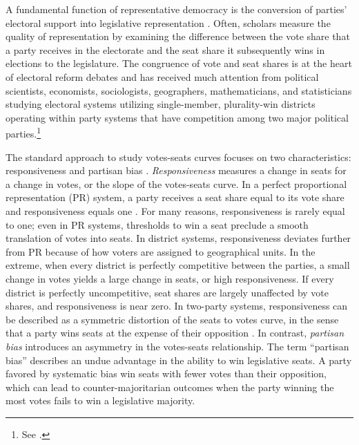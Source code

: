 \documentclass[letter,12pt]{article}
\begin{document}





\noindent A fundamental function of representative democracy is the conversion of parties' electoral support into legislative representation \citep{lijphartElSysPtySys.1994}. Often, scholars measure the quality of representation by examining the difference between the vote share that a party receives in the electorate and the seat share it subsequently wins in elections to the legislature. The congruence of vote and seat shares is at the heart of electoral reform debates and has received much attention from political scientists, economists, sociologists, geographers, mathematicians, and statisticians studying electoral systems utilizing single-member, plurality-win districts operating within party systems that have competition among two major political parties.\footnote{See \citet{altman.mcdonald2011bard,balinskiYoung2001FairRep,brady.grofmanBiasResponsiveness1991,cain.partisanRedistricting.1985,cox.katz.2002,engstrom2006redisttrictApsr,erikson1972malapportionment,gelman.king.1994EvalElSysRedis,grofmanBiasProportionality.1983,grofman.etalBiasMalapp.1997,gudgin.taylor.1980decomposeBias,JohnstonCreepingMal,kendall.stuartCubeLaw1950,king.browning1987biasRespUS,niemi.fett1986swing,rae.1967,rossiter.etal.1997,taagepera.CubeLaw.1973,trelles.mtz.polygob2012,tufte1973seatsVotes}.\label{fn:cites}}

The standard approach to study votes-seats curves focuses on two characteristics: responsiveness and partisan bias \citep{tufte1973seatsVotes,king.browning1987biasRespUS}. \emph{Responsiveness} measures a change in seats for a change in votes, or the slope of the votes-seats curve. In a perfect proportional representation (PR) system, a party receives a seat share equal to its vote share and responsiveness equals one \citet{taagepera.shugart.1989,linzerSeatVoteElasticity2012}. For many reasons, responsiveness is rarely equal to one; even in PR systems, thresholds to win a seat preclude a smooth translation of votes into seats. In district systems, responsiveness deviates further from PR because of how voters are assigned to geographical units. In the extreme, when every district is perfectly competitive between the parties, a small change in votes yields a large change in seats, or high responsiveness. If every district is perfectly uncompetitive, seat shares are largely unaffected by vote shares, and responsiveness is near zero. In two-party systems, responsiveness can be described as a symmetric distortion of the seats to votes curve, in the sense that a party wins seats at the expense of their opposition \citep{grofman.king.2008.partisansymmetry}. In contrast, \emph{partisan bias} introduces an asymmetry in the votes-seats relationship. The term ``partisan bias'' describes an undue advantage in the ability to win legislative seats. A party favored by systematic bias win seats with fewer votes than their opposition, which can lead to counter-majoritarian outcomes when the party winning the most votes fails to win a legislative majority.
\end{document}
